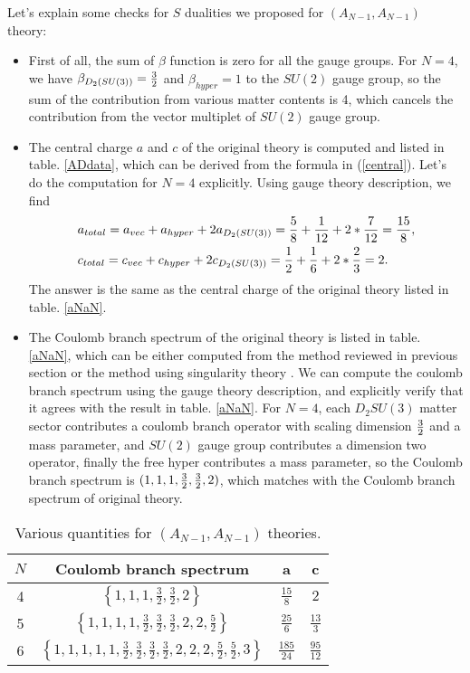 \documentclass[a4paper,11pt]{article}
\begin{document}
 Let's explain some checks for $S$ dualities we proposed for $(A_{N-1}, A_{N-1})$ theory:
\begin{itemize}
\item First of all, the sum of $\beta$ function is zero for all the gauge groups. For $N=4$, we have $\beta_{D_2(SU(3))}={3\over 2}$ and $\beta_{hyper}=1$ to the $SU(2)$ gauge group, so the sum of 
the contribution from various matter contents is 4, which cancels the contribution from the vector multiplet of $SU(2)$ gauge group.
\item The central charge $a$ and $c$ of the original theory is computed and listed in table. \ref{ADdata}, which can be derived from the formula in (\ref{central}). 
Let's do the computation for $N=4$ explicitly. Using gauge theory description, we find 
\begin{align}
&a_{total}=a_{vec}+a_{hyper}+2a_{D_2(SU(3))}={5\over 8}+{1\over 12}+2*{7\over 12}={15\over8}, \nonumber\\
&c_{total}=c_{vec}+c_{hyper}+2c_{D_2(SU(3))}=  {1\over 2}   +{1\over 6}+2*{2\over3}=2.
\end{align}
The answer is the same as the central charge of the original theory listed in table. \ref{aNaN}.
\item The Coulomb branch spectrum of the original theory is listed in table. \ref{aNaN}, which can be either computed from the method reviewed in previous section or the method 
using singularity theory \cite{Xie:2015rpa}. We can compute the coulomb branch spectrum using the gauge theory description, 
and explicitly verify that it agrees with the result in table. \ref{aNaN}. For $N=4$, each $D_2 SU(3)$ matter sector contributes a coulomb branch operator with scaling dimension ${3\over 2}$ and 
a mass parameter, and $SU(2)$ gauge group contributes a dimension two operator, finally the free hyper contributes a mass parameter, so the Coulomb branch spectrum 
is $(1,1,1,{3\over 2}, {3\over 2}, 2)$, which matches with the Coulomb branch spectrum of original theory. 
\end{itemize}


\begin{table}[!htb]
\begin{center}
  \begin{tabular}{ |c|c|c|c|}
    \hline
     $N$& Coulomb branch spectrum & a&c \\ \hline
     4 & $\left\{1,1,1,\frac{3}{2},\frac{3}{2},2\right\}$& $\frac{15}{8}$ & $2$ \\ \hline
     5 & $\left\{1,1,1,1,\frac{3}{2},\frac{3}{2},\frac{3}{2},2,2,\frac{5}{2}\right\}$ & $\frac{25}{6}$ & $\frac{13}{3}$ \\ \hline
     6&$\left\{1,1,1,1,1,\frac{3}{2},\frac{3}{2},\frac{3}{2},\frac{3}{2},2,2,2,\frac{5}{2},\frac{5}{2},3\right\}$ & $\frac{185}{24}$ &$\frac{95}{12}$ \\ \hline
  \end{tabular}
  \end{center}
  \caption{ Various quantities for $(A_{N-1}, A_{N-1})$ theories.}
  \label{aNaN}
  \label{d}
\end{table}
\end{document}
